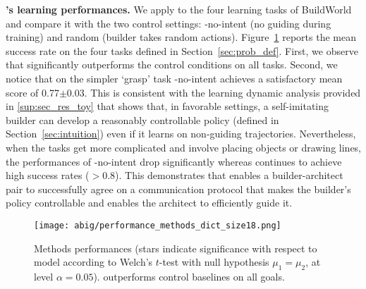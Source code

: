 \textbf{\abig's learning performances.} We apply \abig to the four learning tasks of BuildWorld and compare it with the two control settings: \abig-no-intent (no guiding during training) and random (builder takes random actions). Figure~\ref{fig:methods_performance} reports the mean success rate on the four tasks defined in Section~\ref{sec:prob_def}. First, we observe that \abim significantly outperforms the control conditions on all tasks. Second, we notice that on the simpler `grasp' task \abim-no-intent achieves a satisfactory mean score of 0.77$\pm0.03$. This is consistent with the learning dynamic analysis provided in \ap\ref{sup:sec_res_toy} that shows that, in favorable settings, a self-imitating builder can develop a reasonably controllable policy (defined in Section~\ref{sec:intuition}) even if it learns on non-guiding trajectories.
Nevertheless, when the tasks get more complicated and involve placing objects or drawing lines, the performances of \abim-no-intent drop significantly whereas \abim continues to achieve high success rates ($>0.8$). 
This demonstrates that \abim enables a builder-architect pair to successfully agree on a communication protocol that makes the builder's policy controllable and enables the architect to efficiently guide it. 
%
\begin{figure}[!h]
    \centering
    \vspace{-.2cm}
    \texttt{[image: abig/performance\_methods\_dict\_size18.png]}
    \vspace{-.3cm}
    \caption{Methods performances (stars indicate significance with respect to \abim model according to Welch's $t$-test with null hypothesis $\mu_1=\mu_2$, at level $\alpha=0.05$). \abig outperforms control baselines on all goals.}
    \label{fig:methods_performance}
\end{figure}
%
